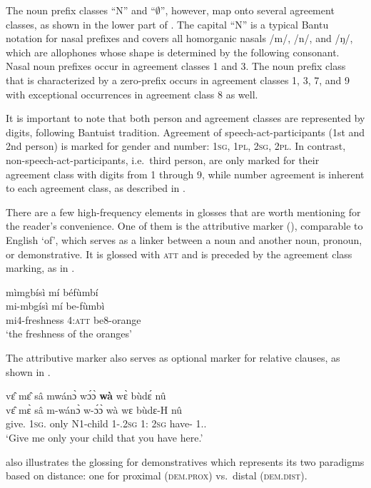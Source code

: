  The noun prefix classes ``N'' and ``$\emptyset$'', however, map onto several agreement classes, as shown in the lower part of . The capital ``N'' is a typical Bantu notation for nasal prefixes and covers all homorganic nasals /m/, /n/, and /ŋ/, which are allophones whose shape is determined by the following consonant.  Nasal noun prefixes occur in agreement classes 1 and 3. The noun prefix class that is characterized by a zero-prefix occurs in agreement classes 1, 3, 7, and 9 with exceptional occurrences in agreement class 8 as well.

It is important to note that both person and agreement classes are represented by digits, following Bantuist tradition. Agreement of speech-act-participants (1st and 2nd person) is marked for gender and number: 1\textsc{sg}, 1\textsc{pl}, 2\textsc{sg}, 2\textsc{pl}. In contrast, non-speech-act-participants, i.e.\ third person, are only marked for their agreement class with digits from 1 through 9, while number agreement is inherent to each agreement class, as described in .

There are a few high-frequency elements in glosses that are worth mentioning for the reader's convenience. One of them is the attributive marker (), comparable to English `of', which serves as a linker between a noun and another noun, pronoun, or demonstrative. It is glossed with \textsc{att} and is preceded by the agreement class marking, as in .

\ea \label{Gatt1}
  \glll mìmgbísì mí béfùmbí\\
        mi-mbgísì mí be-fùmbì\\
        mi4-freshness 4:\textsc{att} be8-orange\\
  \trans `the freshness of the oranges'
\z


The attributive marker also serves as optional marker for relative clauses, as shown in .

\ea \label{Gatt2}
  \glll  vɛ̂ mɛ̂ sâ mwánɔ̀ wɔ́ɔ̀ {\bfseries wà} wɛ̀ bùdɛ́ nû\\
         vɛ̂ mɛ̀ sâ m-wánɔ̀ w-ɔ́ɔ̀ wà wɛ bùdɛ-H nû\\
          give.{\IMP} 1\textsc{sg}.{\OBJ} only {N1}-child 1-{\POSS}.2\textsc{sg} 1:{\ATT} 2\textsc{sg} have-{\R} 1.{\DEM}.{\PROX}\\
    \trans `Give me only your child that you have here.'
\z

 also illustrates the glossing for demonstratives which represents its two paradigms based on distance: one for proximal (\textsc{dem.prox}) vs.\ distal (\textsc{dem.dist}).

